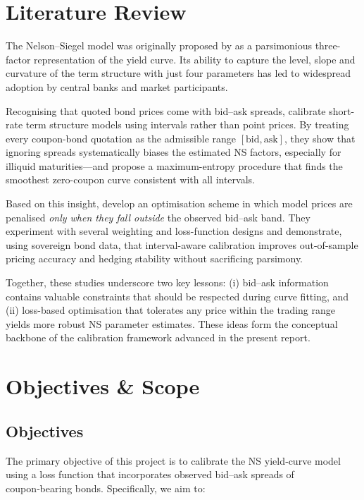 \documentclass[12pt]{article}
\begin{document}
\section{Literature Review}\label{sec:lit-review}

The Nelson--Siegel model was originally proposed by \citet{NelsonSiegel1987} as a parsimonious three-factor representation of the yield curve.  
Its ability to capture the level, slope and curvature of the term structure with just four parameters has led to widespread adoption by central banks and market participants.

Recognising that quoted bond prices come with bid–ask spreads, \citet{GomesGoncalvesGzylMayoral2017} calibrate short-rate term structure models using intervals rather than point prices.  
By treating every coupon-bond quotation as the admissible range \([\text{bid},\text{ask}]\), they show that ignoring spreads systematically biases the estimated NS factors, especially for illiquid maturities—and propose a maximum-entropy procedure that finds the smoothest zero-coupon curve consistent with all intervals.

Based on this insight, \citet{LapshinSohatskaya2020} develop an optimisation scheme in which model prices are penalised {\em only when they fall outside} the observed bid–ask band.  
They experiment with several weighting and loss-function designs and demonstrate, using sovereign bond data, that interval-aware calibration improves out-of-sample pricing accuracy and hedging stability without sacrificing parsimony.

Together, these studies underscore two key lessons:  
(i) bid–ask information contains valuable constraints that should be respected during curve fitting, and  
(ii) loss-based optimisation that tolerates any price within the trading range yields more robust NS parameter estimates.  
These ideas form the conceptual backbone of the calibration framework advanced in the present report.

\section{Objectives \& Scope}

\subsection{Objectives}

The primary objective of this project is to calibrate the NS yield‑curve model using a loss function that incorporates observed bid–ask spreads of coupon‑bearing bonds. Specifically, we aim to:
\end{document}
